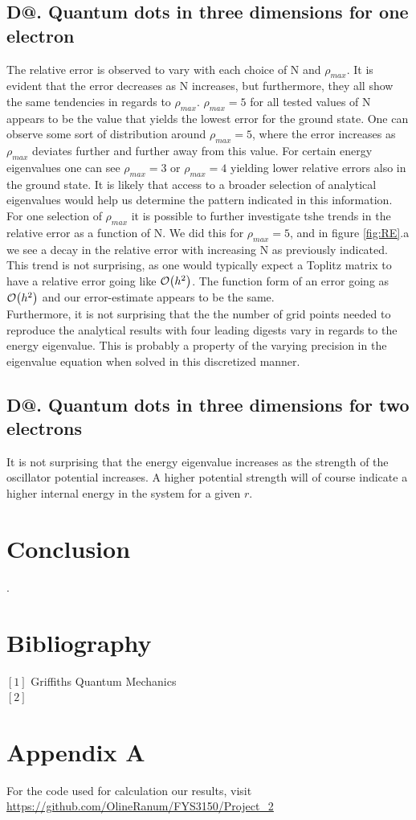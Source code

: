 \documentclass[%
reprint,
amsmath,amssymb,
aps,
]{revtex4-1}
\makeatletter
\newcommand*{\rom}[1]{\expandafter\@slowromancap\romannumeral #1@}
\makeatother
\begin{document}
\subsection*{D\rom{2}. Quantum dots in three dimensions for one electron} \noindent 
The relative error is observed to vary with each choice of N and $\rho_{max}$. It is evident that the error decreases as N increases, but furthermore, they all show the same tendencies in regards to $\rho_{max}$. $\rho_{max} = 5$ for all tested values of N appears to be the value that yields the lowest error for the ground state. One can observe some sort of distribution around $\rho_{max} = 5$, where the error increases as $\rho_{max}$ deviates further and further away from this value. For certain energy eigenvalues one can see $\rho_{max} = 3$ or $\rho_{max} = 4$ yielding lower relative errors also in the ground state. It is likely that access to a broader selection of analytical eigenvalues would help us determine the pattern indicated in this information. \\ \indent 
For one selection of $\rho_{max}$ it is possible to further investigate tshe trends in the relative error as a function of N. We did this for $\rho_{max} = 5$, and in figure \ref{fig:RE}.a we see a decay in the relative error with increasing N as previously indicated. This trend is not surprising, as one would typically expect a Toplitz matrix to have a relative error going like $\order{h^2}$. The function form of an error going as $\order{h^2}$ and our error-estimate appears to be the same. \\ \indent 
Furthermore, it is not surprising that the the number of grid points needed to reproduce the analytical results with four leading digests vary in regards to the energy eigenvalue. This is probably a property of the varying precision in the eigenvalue equation when solved in this discretized manner.  

\subsection*{D\rom{3}. Quantum dots in three dimensions for two electrons} \noindent 
It is not surprising that the energy eigenvalue increases as the strength of the oscillator potential increases. A higher potential strength will of course indicate a higher internal energy in the system for a given $r$.  


\section*{Conclusion}


\newpage .
\newpage 
\onecolumngrid
\section*{Bibliography}
\noindent $[1]$ Griffiths Quantum Mechanics\\ 
$[2]$
\section*{Appendix A}
For the code used for calculation our results, visit
\url{https://github.com/OlineRanum/FYS3150/Project_2}
\end{document}
